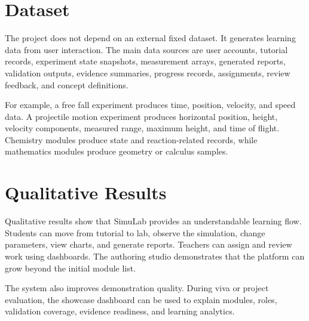 \documentclass[12pt,a4paper]{report}
\begin{document}
\section{Dataset}
The project does not depend on an external fixed dataset. It generates learning data from user interaction. The main data sources are user accounts, tutorial records, experiment state snapshots, measurement arrays, generated reports, validation outputs, evidence summaries, progress records, assignments, review feedback, and concept definitions.

For example, a free fall experiment produces time, position, velocity, and speed data. A projectile motion experiment produces horizontal position, height, velocity components, measured range, maximum height, and time of flight. Chemistry modules produce state and reaction-related records, while mathematics modules produce geometry or calculus samples.

\section{Qualitative Results}
Qualitative results show that SimuLab provides an understandable learning flow. Students can move from tutorial to lab, observe the simulation, change parameters, view charts, and generate reports. Teachers can assign and review work using dashboards. The authoring studio demonstrates that the platform can grow beyond the initial module list.

The system also improves demonstration quality. During viva or project evaluation, the showcase dashboard can be used to explain modules, roles, validation coverage, evidence readiness, and learning analytics.
\end{document}
